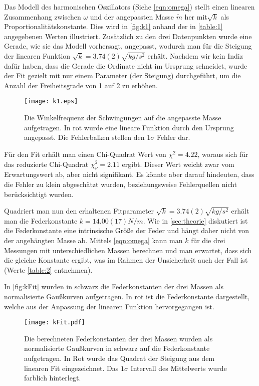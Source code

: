 Das Modell des harmonischen Oszillators (Siehe \autoref{eqn:omega}) stellt einen linearen Zusammenhang zwischen \( \omega \) und der angepassten Masse \( \tilde{m} \) her mit\( \sqrt{k} \) als Proportionalitätskonstante. Dies wird in \autoref{fig:k1} anhand der in \autoref{table:1} angegebenen Werten illustriert. Zusätzlich zu den drei Datenpunkten wurde eine Gerade, wie sie das Modell vorhersagt, angepasst, wodurch man für die Steigung der linearen Funktion \( \sqrt{k} = 3.74(2) \unit{\sqrt{kg / s^2}} \) erhält. Nachdem wir kein Indiz dafür haben, dass die Gerade die Ordinate nicht im Ursprung schneidet, wurde der Fit gezielt mit nur einem Parameter (der Steigung) durchgeführt, um die Anzahl der Freiheitsgrade von 1 auf 2 zu erhöhen. 

\begin{figure}[H]
	\centering
	\texttt{[image: k1.eps]}
	\caption[Zusammenhang zwischen \( \omega \) und \( \tilde{m} \)]{Die Winkelfrequenz der Schwingungen auf die angepasste Masse aufgetragen. In rot wurde eine lineare Funktion durch den Ursprung angepasst. Die Fehlerbalken stellen den $1\sigma$ Fehler dar.}
	\label{fig:k1}
\end{figure}

Für den Fit erhält man einen Chi-Quadrat Wert von \( \chi^2 = 4.22 \), woraus sich für das reduzierte Chi-Quadrat \( \chi_{\nu}^2 = 2.11 \) ergibt. Dieser Wert weicht zwar vom Erwartungswert ab, aber nicht signifikant. Es könnte aber darauf hindeuten, dass die Fehler zu klein abgeschätzt wurden, beziehungsweise Fehlerquellen nicht berücksichtigt wurden. 

Quadriert man nun den erhaltenen Fitparameter \( \sqrt{k} = 3.74(2) \unit{\sqrt{kg / s^2}} \) erhält man die Federkonstante \( k = 14.00(17) \unit{N/m} \). Wie in \autoref{sec:theorie} diskutiert ist die Federkonstante eine intrinsische Größe der Feder und hängt daher nicht von der angehängten Masse ab. Mittels \autoref{eqn:omega} kann man \( k \) für die drei Messungen mit unterschiedlichen Massen berechnen und man erwartet, dass sich die gleiche Konstante ergibt, was im Rahmen der Unsicherheit auch der Fall ist (Werte \autoref{table:2} entnehmen). 

In \autoref{fig:kFit} wurden in schwarz die Federkonstanten der drei Massen als normalisierte Gaußkurven aufgetragen. In rot ist die Federkonstante dargestellt, welche aus der Anpassung der linearen Funktion hervorgegangen ist.
\begin{figure}[H]
	\centering
	\texttt{[image: kFit.pdf]}
	\caption[Vergleich der Federkonstanten als normalisierte Gaußkurven]{Die berechneten Federkonstanten der drei Massen wurden als normalisierte Gaußkurven in schwarz auf die Federkonstante aufgetragen. In Rot wurde das Quadrat der Steigung aus dem linearen Fit eingezeichnet. Das \( 1\sigma \) Intervall des Mittelwerts wurde farblich hinterlegt.}
	\label{fig:kFit}
\end{figure}

